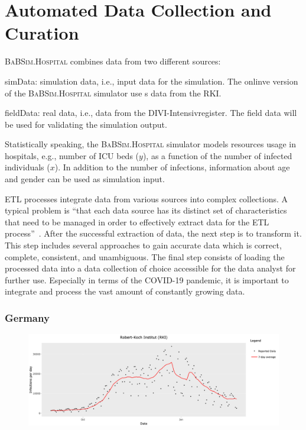 \documentclass[conference]{IEEEtran}
\newcommand{\babsimhospital}{\textsc{BaBSim.Hospital}\xspace}
\begin{document}
\section{Automated Data Collection and Curation}\label{sec:data}
\babsimhospital combines data from two different sources:
\begin{compactenum}
\item simData: simulation data, i.e., input data for the simulation. The onlinve version of the \babsimhospital simulator use s data from the \gls{RKI}.
\item fieldData: real data, i.e., data from the DIVI-Intensivregister. The 
  field data will be used for validating the simulation output. 
\end{compactenum}
Statistically speaking, the \babsimhospital simulator models 
 resources usage in hospitals, e.g., number of \gls{ICU} beds ($y$), as a function 
of the number of infected individuals ($x$).
In addition to the number of infections, information about age and gender can be used as simulation input.

\gls{ETL} processes integrate data from various sources into complex collections. 
A typical problem is ``that each data source has its distinct set of characteristics 
that need to be managed in order to effectively extract data for the \gls{ETL} process''~\citep{ELSAPPAGH201191}. 
After the successful extraction of data, the next step is to transform it. 
This step includes several approaches to gain accurate data which is correct, complete, consistent, and unambiguous.  
The final step consists of loading the processed data into a data collection of choice accessible for the data analyst for further use.
Especially in terms of the COVID-19 pandemic, it is important to integrate and process the vast amount of constantly growing data. 

\subsubsection{Germany}


\begin{figure}
    \centering
    \includegraphics[width=0.75\linewidth]{infections.png}
    \caption{}
\label{fig:rki}
\end{figure}
\end{document}
